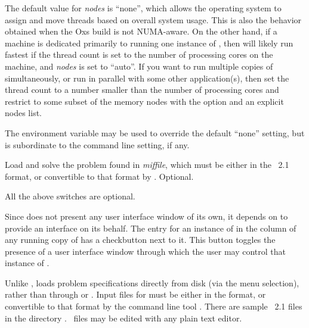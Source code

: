\begin{description}
  The default value for \textit{nodes} is ``none'', which allows the
  operating system to assign and move threads based on overall system
  usage.  This is also the behavior obtained when the Oxs build is not
  NUMA-aware.  On the other hand, if a machine is dedicated primarily
  to running one instance of , then  will
  likely run fastest if the thread count is set to the number of
  processing cores on the machine, and \textit{nodes} is set to
  ``auto''.  If you want to run multiple copies of 
  simultaneously, or run  in parallel with some other
  application(s), then set the thread count to a number smaller than
  the number of processing cores and restrict  to some
  subset of the memory nodes with the  option and an
  explicit nodes list.

  The environment variable
  may be used to override the default ``none'' setting, but is
  subordinate to the command line setting, if any.
\item[\optkey{miffile}]
  Load and solve the problem found in \textit{miffile}, which must be
  either in the \MIF~2.1 format, or convertible to that format by 
  .  Optional.
\end{description}
All the above switches are optional.

Since  does not present
any user interface window of its own, it depends on
 to provide an interface on
its behalf.  The entry for an instance of  in the
 column of any running copy of
 has a checkbutton next to it.  This button toggles the
presence of a user interface window through which the user may control
that instance of .


Unlike ,
 loads problem specifications
directly from disk (via the  menu selection),
rather than through
 or
.  Input files for  must be either
in the 
format, or convertible to that format by the command line tool
.  There are sample \MIF~2.1 files in the
directory .  \MIF\ files may be edited with
any plain text editor.

